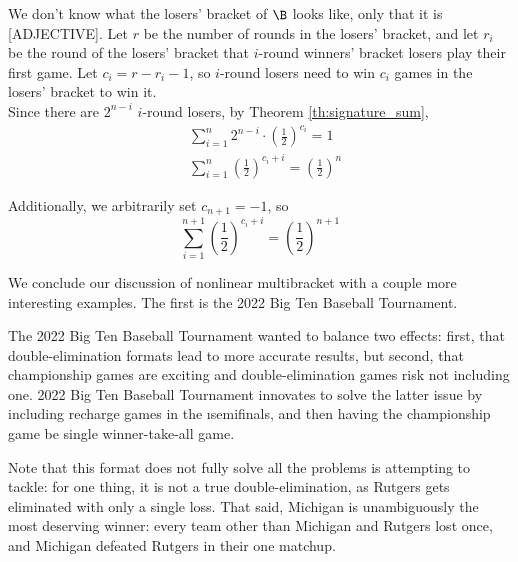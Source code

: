 {{        We don't know what the losers' bracket of $\B$ looks like, only that it is [ADJECTIVE]. Let $r$ be the number of rounds in the losers' bracket, and let $r_i$ be the round of the losers' bracket that $i$-round winners' bracket losers play their first game. Let $c_i = r - r_i - 1$, so $i$-round losers need to win $c_i$ games in the losers' bracket to win it.\\
        
        Since there are $2^{n-i}$ $i$-round losers, by Theorem \ref{th:signature_sum},
        \begin{align*}
            &\sum_{i=1}^n 2^{n-i} \cdot \left(\frac{1}{2}\right)^{c_i}  = 1 \\
            &\sum_{i=1}^n \left(\frac{1}{2}\right)^{c_i + i} = \left(\frac{1}{2}\right)^n
        \end{align*}
       
        Additionally, we arbitrarily set $c_{n+1} = -1$, so 
        $$ \sum_{i=1}^{n+1} \left(\frac{1}{2}\right)^{c_i + i} = \left(\frac{1}{2}\right)^{n+1}$$



    }{}









    We conclude our discussion of nonlinear multibracket with a couple more interesting examples. The first is the 2022 Big Ten Baseball Tournament. %


    The 2022 Big Ten Baseball Tournament wanted to balance two effects: first, that double-elimination formats lead to more accurate results, but second, that championship games are exciting and double-elimination games risk not including one. 2022 Big Ten Baseball Tournament innovates to solve the latter issue by including recharge games in the \i{semifinals}, and then having the championship game be single winner-take-all game.

    Note that this format does not fully solve all the problems is attempting to tackle: for one thing, it is not a true double-elimination, as Rutgers gets eliminated with only a single loss. That said, Michigan is unambiguously the most deserving winner: every team other than Michigan and Rutgers lost once, and Michigan defeated Rutgers in their one matchup.
    
}
